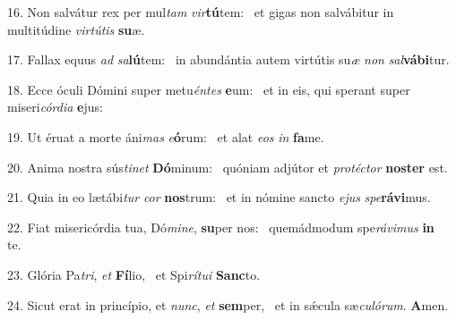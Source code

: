 16. Non salvátur rex per mul\textit{tam} \textit{vir}\textbf{tú}tem: \ast\  et gigas non salvábitur in multitúdine \textit{vir}\textit{tú}\textit{tis} \textbf{su}æ.\

17. Fallax equus \textit{ad} \textit{sa}\textbf{lú}tem: \ast\  in abundántia autem virtútis su\textit{æ} \textit{non} \textit{sal}\textbf{vá}\textbf{bi}tur.\

18. Ecce óculi Dómini super metu\textit{én}\textit{tes} \textbf{e}um: \ast\  et in eis, qui sperant super miseri\textit{cór}\textit{di}\textit{a} \textbf{e}jus:\

19. Ut éruat a morte áni\textit{mas} \textit{e}\textbf{ó}rum: \ast\  et alat \textit{e}\textit{os} \textit{in} \textbf{fa}me.\

20. Anima nostra sús\textit{ti}\textit{net} \textbf{Dó}minum: \ast\  quóniam adjútor et \textit{pro}\textit{téc}\textit{tor} \textbf{nos}\textbf{ter} est.\

21. Quia in eo lætábi\textit{tur} \textit{cor} \textbf{nos}trum: \ast\  et in nómine sancto \textit{e}\textit{jus} \textit{spe}\textbf{rá}\textbf{vi}mus.\

22. Fiat misericórdia tua, Dó\textit{mi}\textit{ne}, \textbf{su}per nos: \ast\  quemádmodum spe\textit{rá}\textit{vi}\textit{mus} \textbf{in} te.\

23. Glória Pa\textit{tri}, \textit{et} \textbf{Fí}lio, \ast\  et Spi\textit{rí}\textit{tu}\textit{i} \textbf{Sanc}to.\

24. Sicut erat in princípio, et \textit{nunc}, \textit{et} \textbf{sem}per, \ast\  et in sǽcula sæ\textit{cu}\textit{ló}\textit{rum}. \textbf{A}men.\

